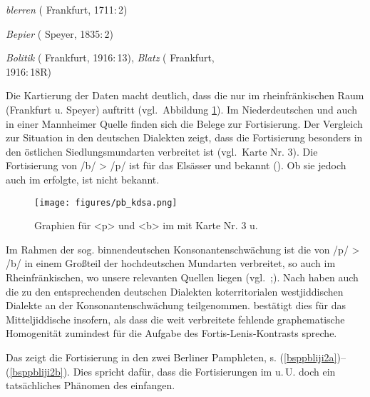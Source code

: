 {{\item \textit{blerren}  ( Frankfurt, 1711:\,2)\label{bsptbp1}
\item \textit{Bepier}  ( Speyer, 1835:\,2)\label{bsptbp2}
\item \textit{Bolitik}  ( Frankfurt, 1916:\,13),  \textit{Blatz}  ( Frankfurt,\\  1916:\,18R)\label{bsptbp3} \,%
  }
   
 


  Die Kartierung der Daten macht deutlich, dass die  nur im rheinfränkischen Raum (Frankfurt u. Speyer) auftritt (vgl.\, Abbildung \ref{kartebpkdsa}). Im Niederdeutschen und auch in einer Mannheimer Quelle finden sich die Belege zur Fortisierung. Der Vergleich zur Situation in den deutschen Dialekten zeigt, dass die Fortisierung besonders in den östlichen Siedlungsmundarten verbreitet ist (vgl.\,  Karte Nr. 3).  Die Fortisierung von /b/ > /p/ ist für das Elsässer \hai{{\SWJ}} und  bekannt (\citealt[353,  356]{Bin-Nun1973}). Ob sie jedoch auch im \hai{{\NWJ}} erfolgte, ist nicht bekannt.

      \begin{figure}[t]
		\centering
\texttt{[image: figures/pb\_kdsa.png]}
		\caption{\label{kartebpkdsa} Graphien für <p> und <b> im  mit  Karte Nr. 3 u. \cite[148]{Koenig1978}}
		\end{figure}

  Im Rahmen der sog. binnendeutschen Konsonantenschwächung ist die  von /p/ > /b/  in einem Großteil der hochdeutschen Mundarten verbreitet, so auch im Rheinfränkischen, wo unsere relevanten Quellen liegen (vgl.\, \citealt[330–346]{Schirmunski1962};\citealt[148f]{Koenig1978}). Nach \cite[221]{Klepsch2004} haben auch die zu den entsprechenden deutschen Dialekten koterritorialen westjiddischen Dialekte an der Konsonantenschwächung teilgenommen. \cite[298–303]{Timm1987} bestätigt dies für das Mitteljiddische insofern, als dass die weit verbreitete fehlende graphematische Homogenität zumindest für die Aufgabe des Fortis-Lenis-Kontrasts spreche.
   


 
 
Das  zeigt die Fortisierung in den zwei Berliner Pamphleten, s. (\ref{bsppbliji2a})--(\ref{bsppbliji2b}). Dies spricht dafür, dass die Fortisierungen im  u.\,U. doch ein tatsächliches Phänomen des \hai{{\NWJ}} einfangen.

}
